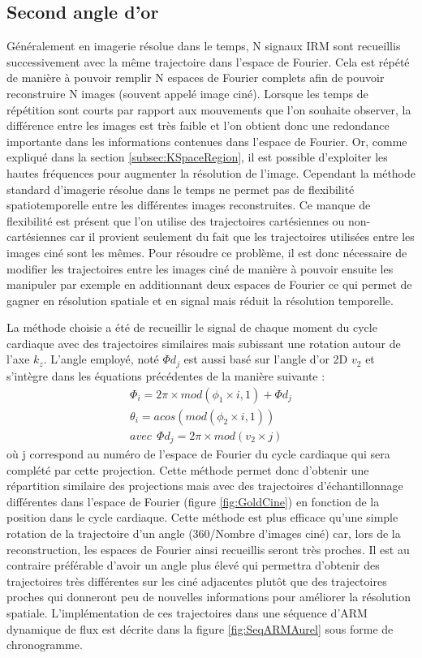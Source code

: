 \subsection{Second angle d'or}

Généralement en imagerie résolue dans le temps, N signaux IRM sont recueillis successivement avec la même trajectoire dans l'espace de Fourier. Cela est répété de manière à pouvoir remplir N espaces de Fourier complets afin de pouvoir reconstruire N images (souvent appelé image ciné). Lorsque les temps de répétition sont courts par rapport aux mouvements que l'on souhaite observer, la différence entre les images est très faible et l'on obtient donc une redondance importante dans les informations contenues dans l'espace de Fourier. Or, comme expliqué dans la section \ref{subsec:KSpaceRegion}, il est possible d'exploiter les hautes fréquences pour augmenter la résolution de l'image. Cependant la méthode standard d'imagerie résolue dans le temps ne permet pas de flexibilité spatiotemporelle entre les différentes images reconstruites. Ce manque de flexibilité est présent que l'on utilise des trajectoires cartésiennes ou non-cartésiennes car il provient seulement du fait que les trajectoires utilisées entre les images ciné sont les mêmes. Pour résoudre ce problème, il est donc nécessaire de modifier les trajectoires entre les images ciné de manière à pouvoir ensuite les manipuler par exemple en additionnant deux espaces de Fourier ce qui permet de gagner en résolution spatiale et en signal mais réduit la résolution temporelle. 

La méthode choisie a été de recueillir le signal de chaque moment du cycle cardiaque avec des trajectoires similaires mais subissant une rotation autour de l'axe $k_z$. L'angle employé, noté $\Phi d_j$ est aussi basé sur l'angle d'or 2D $v_2$ et s'intègre dans les équations précédentes de la manière suivante :
\begin{equation}
\begin{array}{c}
\Phi_i=2\pi \times mod(\phi_1 \times i,1) +\Phi d_j\\
\theta_i=acos(mod(\phi_2 \times i,1)) \\
avec\ \ \Phi d_j=2\pi \times  mod( v_2 \times j)
\end{array}
\end{equation}
où j correspond au numéro de l'espace de Fourier du cycle cardiaque qui sera complété par cette projection. Cette méthode permet donc d'obtenir une répartition similaire des projections mais avec des trajectoires d'échantillonnage différentes dans l'espace de Fourier (figure \ref{fig:GoldCine}) en fonction de la position dans le cycle cardiaque. Cette méthode est plus efficace qu'une simple rotation de la trajectoire d'un angle (360/Nombre d'images ciné) car, lors de la reconstruction, les espaces de Fourier ainsi recueillis seront très proches. Il est au contraire préférable d'avoir un angle plus élevé qui permettra d'obtenir des trajectoires très différentes sur les ciné adjacentes plutôt que des trajectoires proches qui donneront peu de nouvelles informations pour améliorer la résolution spatiale. 
L'implémentation de ces trajectoires dans une séquence d'ARM dynamique de flux est décrite dans la figure \ref{fig:SeqARMAurel} sous forme de chronogramme.
 
